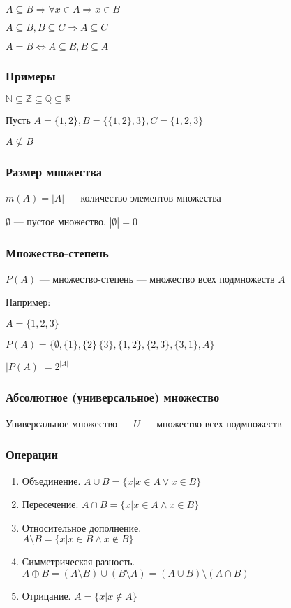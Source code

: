 \documentclass{article}
\begin{document}
$A \subseteq B \Rightarrow \forall x \in A \Rightarrow x \in B$

$A \subseteq B, B \subseteq C \Rightarrow A \subseteq C$

$A = B \Leftrightarrow A \subseteq B, B \subseteq A$

\subsubsection{Примеры}

$\mathbb{N} \subseteq \mathbb{Z} \subseteq \mathbb{Q} \subseteq \mathbb{R}$

Пусть $A = \{1, 2\}, B = \{\{1, 2\}, 3\}, C = \{1, 2, 3\}$

$A \not \subseteq B$

\subsubsection{Размер множества}

$m(A) = |A|$ --- количество элементов множества

$\emptyset$ --- пустое множество, $|\emptyset| = 0$

\subsubsection{Множество-степень}

$P(A)$ --- множество-степень --- множество всех подмножеств $A$

Например:

$A = \{1, 2, 3\}$

$P(A) = \{\emptyset, \{1\}, \{2\}\, \{3\}, \{1, 2\}, \{2, 3\}, \{3, 1\}, A\}$

$|P(A)| = 2^{|A|}$

\subsubsection{Абсолютное (универсальное) множество}

Универсальное множество --- $U$ --- множество всех подмножеств

\subsubsection{Операции}

\begin{enumerate}
	\item Объединение. $A \cup B = \{x | x \in A \lor x \in B\}$
	\item Пересечение. $A \cap B = \{x | x \in A \land x \in B\}$
	\item Относительное дополнение.\\
	$A \setminus B = \{x | x \in B \land x \not \in B\}$
	\item Симметрическая разность. $A \oplus B = (A \setminus B) \cup (B \setminus A) = (A \cup B) \setminus (A \cap B)$
	\item Отрицание. $\overline{A} = \{x | x \not \in A\}$
\end{enumerate}
\end{document}
